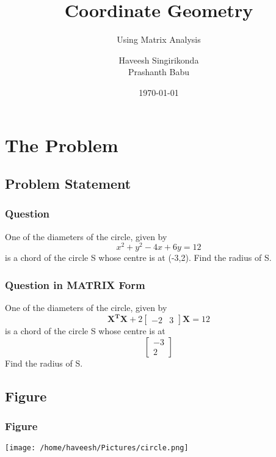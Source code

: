 \documentclass{beamer}
\title{Coordinate Geometry}
\subtitle{Using Matrix Analysis}
\author{Haveesh Singirikonda\\Prashanth Babu}
\institute{IIT Hyderabad}
\date{\today}
\begin{document}
\begin{frame}
\titlepage
\end{frame}
\begin{comment}
\section{Introduction}

\begin{frame}

\frametitle{Matrix Analysis in Coordinate Geometry}
Coordinate Geometry gets much more simpler and easier when Matrices are used to represent points and equations. \\
Matrix transformations can be used in most scenarios to compute distances and to find the equations of lines and conics.

\end{frame}
\end{comment}
\section{The Problem}
\subsection{Problem Statement}

\begin{frame}
\frametitle{Question}
One of the diameters of the circle, given by $$ x^2 + y^2 -4x+6y = 12$$ 
is a chord of the circle S whose centre is at (-3,2).
Find the radius of S.

\end{frame}

\begin{frame}
\frametitle{Question in MATRIX Form}
One of the diameters of the circle, given by $$ \mathbf{X^TX} + 2\left[
\begin{matrix}
-2 & 3 
\end{matrix}
\right]\mathbf{X} = 12 $$ is a chord of the circle S whose centre is at 
$$
\left[
\begin{matrix} 
-3 \\
 2
\end{matrix}
\right] $$ Find the radius of S.
\end{frame}

\subsection{Figure}
\begin{frame}
\frametitle{Figure}
\texttt{[image: /home/haveesh/Pictures/circle.png]}
\end{frame}
\end{document}
